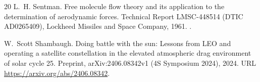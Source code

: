 \documentclass[12pt]{article}
\begin{document}
\begin{thebibliography}{20}
L.~H. Sentman.
\newblock Free molecule flow theory and its application to the determination of
  aerodynamic forces.
\newblock Technical Report LMSC-448514 (DTIC AD0265409), Lockheed Missiles and Space Company,
  1961.
\newblock {}.

W.~Scott Shambaugh.
\newblock Doing battle with the sun: Lessons from {LEO} and operating a
  satellite constellation in the elevated atmospheric drag environment of solar
  cycle 25.
\newblock Preprint, arXiv:2406.08342v1 (4S Symposium 2024), 2024.
\newblock URL \url{https://arxiv.org/abs/2406.08342}.

\end{thebibliography}
\end{document}
